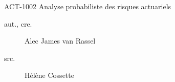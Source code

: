 \begin{contrib}{ACT-1002\: Analyse probabiliste des risques actuariels}
\begin{description}
	\item[aut., cre.] Alec James van Rassel
	\item[src.] Hélène Cossette
\end{description}
\end{contrib}